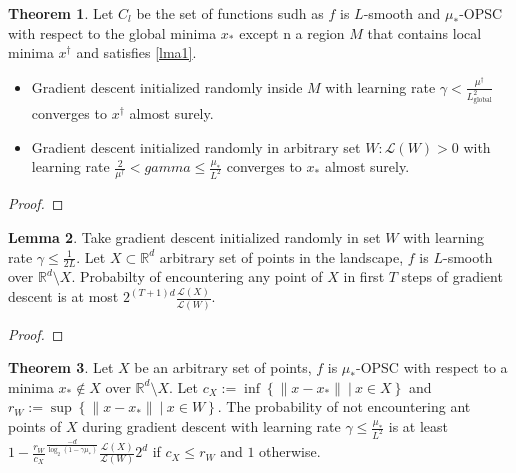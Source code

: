 \documentclass{article}
\theoremstyle{definition}
\newtheorem{theorem}{Theorem}[section]
\newtheorem{lemma}[theorem]{Lemma}
\begin{document}
\begin{theorem}\label{thm1}
    Let $C_l$ be the set of functions sudh as $f$ is 
    $L$-smooth and $\mu_\ast$-OPSC with respect to the 
    global minima $x_\ast$ except n a region $M$ that 
    contains local minima $x^\dagger$ and satisfies \cref{lma1}.
    \begin{itemize}
        \item Gradient descent initialized randomly inside $M$ 
        with learning rate $\gamma < \frac{\mu^\dagger}{L^2_{\mathrm{global}}}$
        converges to $x^\dagger$ almost surely.
        
        \item Gradient descent initialized randomly in 
        arbitrary set $W: \mathcal{L}(W) > 0$ 
        with learning rate $\frac{2}{\mu^\dagger} < gamma \leq \frac{\mu_\ast}{L^2}$
        converges to $x_\ast$ almost surely.

    \end{itemize} 

\end{theorem}
\begin{proof}
    
\end{proof}

\begin{lemma}\label{lma2}
    Take gradient descent initialized randomly in set $W$ 
    with learning rate $\gamma \leq \frac{1}{2L}$.
    Let $X \subset \mathbb{R}^d$ arbitrary set of points in 
    the landscape, $f$ is $L$-smooth over 
    $\mathbb{R}^d \setminus X$. Probabilty of encountering 
    any point of $X$ in first $T$ steps of gradient descent is 
    at most $2 ^ {(T + 1)d} \frac{\mathcal{L}(X)}{\mathcal{L}(W)}$.
\end{lemma}
\begin{proof}
    
\end{proof}

\begin{theorem}\label{thm2}
    Let $X$ be an arbitrary set of points, 
    $f$ is $\mu_\ast$-OPSC with respect to a minima 
    $x_\ast \notin X$ over $\mathbb{R}^d \setminus X$.
    Let $c_X := \inf \left\{ \| x - x_\ast \| \:|\: x \in X  \right\}$
    and $r_W := \sup \left\{ \| x - x_\ast \| \:|\: x \in W \right\}$.
    The probability of not encountering ant points of $X$ during 
    gradient descent with learning rate $\gamma \leq \frac{\mu_\ast}{L^2}$
    is at least $1 - \frac{r_W}{c_X}^{\frac{-d}{\log_2(1 - \gamma \mu_\ast)}} \frac{\mathcal{L}(X)}{\mathcal{L}(W)} 2^d$
    if $c_X \leq r_W$ and $1$ otherwise.
\end{theorem}
\end{document}
